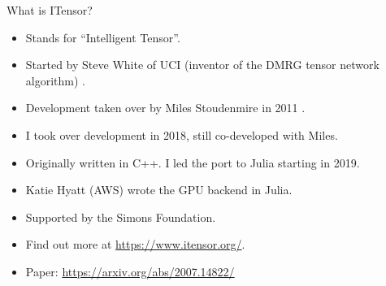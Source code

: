 \begin{frame}{What is ITensor?}

\begin{itemize}[<+->]

  \item Stands for ``Intelligent Tensor''.
  \item Started by Steve White of UCI (inventor of the DMRG tensor network algorithm) .
  \item Development taken over by Miles Stoudenmire in 2011 .
  \item I took over development in 2018, still co-developed with Miles.
  \item Originally written in C++. I led the port to Julia starting in 2019.
  \item Katie Hyatt (AWS) wrote the GPU backend in Julia.
  \item Supported by the Simons Foundation.
  \item Find out more at \url{https://www.itensor.org/}.
  \item Paper: \url{https://arxiv.org/abs/2007.14822/}

\end{itemize}

\end{frame}
